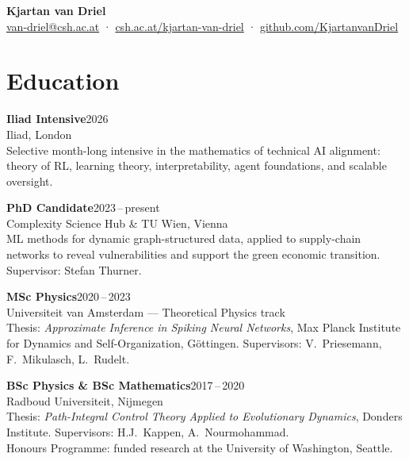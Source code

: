 \documentclass[10pt,a4paper]{article}
\begin{document}
\begin{center}
    {\Large\sffamily\bfseries\color{accent} Kjartan van Driel}\\[0.35em]
    {\small\color{light}
    \href{mailto:van-driel@csh.ac.at}{van-driel@csh.ac.at}%
    \enspace·\enspace
    \href{https://csh.ac.at/kjartan-van-driel/}{csh.ac.at/kjartan-van-driel}%
    \enspace·\enspace
    \href{https://github.com/KjartanvanDriel}{github.com/KjartanvanDriel}
    }
\end{center}

\vspace{0.1em}

\section{Education}

\textbf{Iliad Intensive}\hfill{\small\color{light}2026}\\
Iliad, London\\
{\small Selective month-long intensive in the mathematics of technical AI alignment: theory of RL, learning theory, interpretability, agent foundations, and scalable oversight.}

\vspace{0.28em}

\textbf{PhD Candidate}\hfill{\small\color{light}2023\,--\,present}\\
Complexity Science Hub \& TU Wien, Vienna\\
{\small ML methods for dynamic graph-structured data, applied to supply-chain networks to reveal vulnerabilities and support the green economic transition. Supervisor: Stefan Thurner.}

\vspace{0.28em}

\textbf{MSc Physics}\hfill{\small\color{light}2020\,--\,2023}\\
Universiteit van Amsterdam --- Theoretical Physics track\\
{\small Thesis: \textit{Approximate Inference in Spiking Neural Networks}, Max Planck Institute for Dynamics and Self-Organization, Göttingen. Supervisors: V.~Priesemann, F.~Mikulasch, L.~Rudelt.}

\vspace{0.28em}

\textbf{BSc Physics \& BSc Mathematics}\hfill{\small\color{light}2017\,--\,2020}\\
Radboud Universiteit, Nijmegen\\
{\small Thesis: \textit{Path-Integral Control Theory Applied to Evolutionary Dynamics}, Donders Institute. Supervisors: H.J.~Kappen, A.~Nourmohammad.\\
\hspace*{1.5em}Honours Programme: funded research at the University of Washington, Seattle.}
\end{document}
